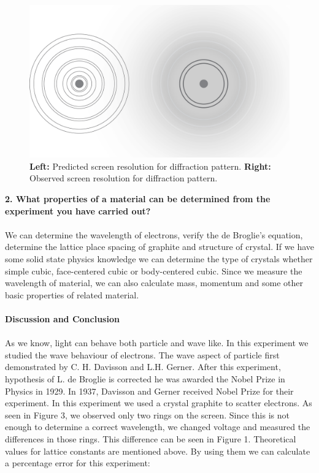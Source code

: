 \documentclass[a4paper,12pt]{article}
\begin{document}
\begin{figure}[h!]
\centering
\includegraphics[scale = 0.65]{screen}
\caption{\textbf{Left:} Predicted screen resolution for diffraction pattern. \textbf{Right:} Observed screen resolution for diffraction pattern. }
\label{fig:screen}
\end{figure}
\newpage
\textbf{2. What properties of a material can be determined from the experiment you have carried out?}\\\\
We can determine the wavelength of electrons, verify the de Broglie's equation, determine the lattice place spacing of graphite and structure of crystal. If we have some solid state physics knowledge we can determine the type of crystals whether simple cubic, face-centered cubic or body-centered cubic. Since we measure the wavelength of material, we can also calculate mass, momentum and some other basic properties of related material.\\\\ 
\textbf{Discussion and Conclusion}\\\\
As we know, light can behave both particle and wave like. In this experiment we studied the wave behaviour of electrons. The wave aspect of particle first demonstrated by C. H. Davisson and L.H. Gerner. After this experiment, hypothesis of L. de Broglie is corrected he was awarded the Nobel Prize in Physics in 1929. In 1937, Davisson and Gerner received Nobel Prize for their experiment. In this experiment we used a crystal graphite to scatter electrons. As seen in Figure 3, we observed only two rings on the screen. Since this is not enough to determine a correct wavelength, we changed voltage and measured the differences in those rings. This difference can be seen in Figure 1. Theoretical values for lattice constants are mentioned above. By using them we can calculate a percentage error for this experiment:
\end{document}
